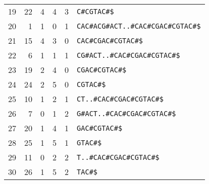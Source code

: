 \begin{table*}
\begin{tabular}{rrrrrl}
        19  & 22 &  4 & 4 & 3 & \texttt{C\#CGTAC\#\$}                           \\
        20  &  1 &  1 & 0 & 1 & \texttt{CAC\#ACG\#ACT..\#CAC\#CGAC\#CGTAC\#\$}  \\
        21  & 15 &  4 & 3 & 0 & \texttt{CAC\#CGAC\#CGTAC\#\$}                   \\
        22  &  6 &  1 & 1 & 1 & \texttt{CG\#ACT..\#CAC\#CGAC\#CGTAC\#\$}        \\
        23  & 19 &  2 & 4 & 0 & \texttt{CGAC\#CGTAC\#\$}                        \\
        24  & 24 &  2 & 5 & 0 & \texttt{CGTAC\#\$}                              \\
        25  & 10 &  1 & 2 & 1 & \texttt{CT..\#CAC\#CGAC\#CGTAC\#\$}             \\
        26  &  7 &  0 & 1 & 2 & \texttt{G\#ACT..\#CAC\#CGAC\#CGTAC\#\$}         \\
        27  & 20 &  1 & 4 & 1 & \texttt{GAC\#CGTAC\#\$}                         \\
        28  & 25 &  1 & 5 & 1 & \texttt{GTAC\#\$}                               \\
        29  & 11 &  0 & 2 & 2 & \texttt{T..\#CAC\#CGAC\#CGTAC\#\$}              \\
        30  & 26 &  1 & 5 & 2 & \texttt{TAC\#\$}                                \\
        \bottomrule
    \end{tabular}
\end{table*}


